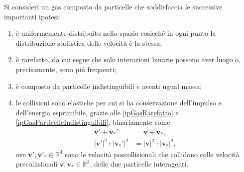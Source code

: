                 \begin{ipo}
                    \label{ipGasPerfetto}
                    Si consideri un gas composto da particelle che soddisfaccia le successive importanti ipotesi:

                    \begin{enumerate}[
                        label=G\arabic*,
                        leftmargin=2em,
                    ]
                        \item\label{ipGasOmogeneo} è uniformemente distribuito nello spazio cosicché in ogni punto la distribuzione statistica delle velocità è la stessa;
                        \item\label{ipGasRarefatto} è rarefatto, da cui segue che solo interazioni binarie possono aver luogo o, precisamente, sono piú frequenti;
                        \item\label{ipGasParticelleIndistinguibili} è composto da particelle indistinguibili e aventi ugual massa;
                        \item\label{ipGasCollisioniElastiche} le collisioni sono elastiche per cui si ha conservazione dell'impulso e dell'energia esprimibile, grazie alle \ref{ipGasRarefatto} e \ref{ipGasParticelleIndistinguibili}, binariamente come
                        \begin{align}
                            \mathbf v'+\mathbf v_*'
                            &=\mathbf v+\mathbf v_*,
                            \label{eqConservazioneImpulso}\tag{CI}\\
                            \vert\mathbf v'\vert^2+\vert \mathbf v_*'\vert^2&=
                            \vert\mathbf v\vert^2+\vert \mathbf v_*\vert^2,
                            \label{eqConservazioneEnergia}\tag{CE}
                        \end{align}
                        ove \(\mathbf v',\mathbf v'_*\in\mathbb R^3\) sono le velocità poscollisionali che collidono colle velocità precollisionali \(\mathbf v,\mathbf v_*\in\mathbb R^3\), delle due particelle interagenti\footnotemark{}.
                    \end{enumerate}
                \end{ipo}

